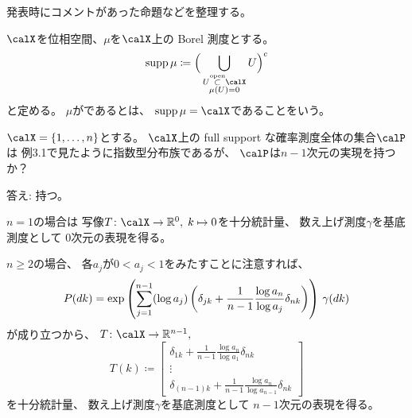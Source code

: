 \documentclass[report]{jlreq}
\begin{document}
%

発表時にコメントがあった命題などを整理する。

\begin{definition}
    $\calX$を位相空間、$\mu$を$\calX$上の Borel 測度とする。
    \begin{equation}
        \supp\mu \coloneqq \Big(
            \bigcup_{\substack{U \opensubset \calX \\ \mu(U) = 0}} U
        \Big)^c
    \end{equation}
    と定める。
    $\mu$がであるとは、
    $\supp\mu = \calX$であることをいう。
\end{definition}

\begin{problem}
    $\calX = \{ 1, \dots, n \}$とする。
    $\calX$上の full support な確率測度全体の集合$\calP$は
    例3.1で見たように指数型分布族であるが、
    $\calP$は$n - 1$次元の実現を持つか？
\end{problem}

\begin{answer}
    答え: 持つ。

    $n = 1$の場合は
    写像$T \colon \calX \to \R^0, \; k \mapsto 0$を十分統計量、
    数え上げ測度$\gamma$を基底測度として
    $0$次元の表現を得る。

    $n \ge 2$の場合、
    各$a_j$が$0 < a_j < 1$をみたすことに注意すれば、
    \begin{equation}
        P(dk)
            = \exp\left({
                \sum_{j = 1}^{n - 1}
                    (\log a_j)
                    \left({
                        \delta_{jk}
                        + \frac{1}{n - 1} \frac{\log a_n}{\log a_j} \delta_{nk}
                    }\right)
            }\right) \, \gamma(dk)
    \end{equation}
    が成り立つから、
    $T \colon \calX \to \R^{n - 1},$
    \begin{equation}
        T(k)
            \coloneqq \begin{bmatrix}
                \delta_{1k}
                    + \frac{1}{n - 1} \frac{\log a_n}{\log a_1} \delta_{nk} \\
                \vdots \\
                \delta_{(n - 1)k}
                    + \frac{1}{n - 1} \frac{\log a_n}{\log a_{n - 1}} \delta_{nk}
            \end{bmatrix}
    \end{equation}
    を十分統計量、
    数え上げ測度$\gamma$を基底測度として
    $n - 1$次元の表現を得る。
\end{answer}
\end{document}
